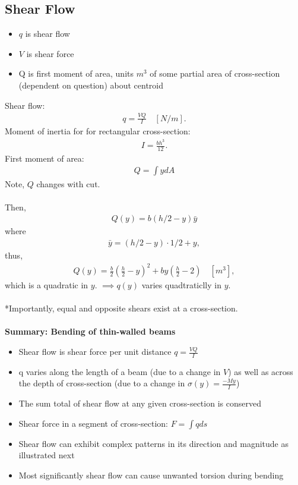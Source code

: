 \documentclass{article}
\numberwithin{equation}{subsection}
\begin{document}
\subsection{Shear Flow}
\begin{itemize}
  \item $q$ is shear flow
  \item $V$ is shear force
  \item Q is first moment of area, units $m^3$ of some partial area of cross-section (dependent on question) about centroid
\end{itemize}
Shear flow:
\begin{align}
  q = \frac{VQ}{I} \quad [N/m].
\end{align}
Moment of inertia for for rectangular cross-section:
\begin{align}
  I = \frac{bh^3}{12}.
\end{align}
First moment of area:
\begin{align}
  Q = \int y dA
\end{align}
Note, $Q$ changes with cut.
\\\\
Then,
\begin{align}
  Q(y) = b(h/2 - y)\bar{y}
\end{align}
where
\begin{align}
  \bar{y} = (h/2 - y)\cdot 1/2 + y, 
\end{align}
thus,
\begin{align}
  Q(y) = \frac{b}{2}\left(\frac{h}{2}-y\right)^2 + by \left(\frac{h}{2}-2\right)\quad [m^3],
\end{align}
which is a quadratic in $y$. $\implies q(y)$ varies quadtraticlly in $y$.
\\\\
*Importantly, equal and opposite shears exist at a cross-section.
\\\\
\textbf{Summary: Bending of thin-walled beams}
\begin{itemize}
  \item Shear flow is shear force per unit distance $q = \frac{VQ}{I}$
  \item q varies along the length of a beam (due to a change in $V$) as well as
  across the depth of cross-section (due to a change in $\sigma(y) = \frac{-My}{I}$)
  \item The sum total of shear flow at any given cross-section is conserved
  \item Shear force in a segment of cross-section: 
  $F = \int q ds$
 \item Shear flow can exhibit complex patterns in its direction and
  magnitude as illustrated next
 \item Most significantly shear flow can cause unwanted torsion during
  bending
\end{itemize}
\end{document}
